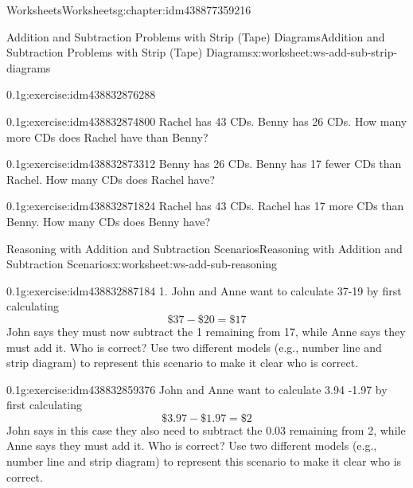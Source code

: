 \documentclass[twoside,11pt,]{book}
\begin{document}
\begin{chapterptx}{Worksheets}{}{Worksheets}{}{}{g:chapter:idm438877359216}
\begin{worksheet-section-numberless}{Addition and Subtraction Problems with Strip (Tape) Diagrams}{}{Addition and Subtraction Problems with Strip (Tape) Diagrams}{}{}{x:worksheet:ws-add-sub-strip-diagrams}
\begin{divisionexercise}{4}{}{0.1}{g:exercise:idm438832876288}
\end{divisionexercise}%
\begin{divisionexercise}{5}{}{0.1}{g:exercise:idm438832874800}%
Rachel has 43 CDs.  Benny has 26 CDs.  How many more CDs does Rachel have than Benny?%
\end{divisionexercise}%
\begin{divisionexercise}{6}{}{0.1}{g:exercise:idm438832873312}%
Benny has 26 CDs. Benny has 17 fewer CDs than Rachel.  How many CDs does Rachel have?%
\end{divisionexercise}%
\begin{divisionexercise}{7}{}{0.1}{g:exercise:idm438832871824}%
Rachel has 43 CDs. Rachel has 17 more CDs than Benny.  How many CDs does Benny have?%
\end{divisionexercise}%
\end{worksheet-section-numberless}
\restoregeometry
%
%
\typeout{************************************************}
\typeout{************************************************}
%
\begin{worksheet-section-numberless}{Reasoning with Addition and Subtraction Scenarios}{}{Reasoning with Addition and Subtraction Scenarios}{}{}{x:worksheet:ws-add-sub-reasoning}
\begin{divisionexercise}{1}{}{0.1}{g:exercise:idm438832887184}%
1.	John and Anne want to calculate \textdollar{}37-\textdollar{}19 by first calculating%
\begin{equation*}
\$37-\$20=\$17 
\end{equation*}
John says they must now subtract the \textdollar{}1 remaining from \textdollar{}17, while Anne says they must add it.  Who is correct?  Use two different models (e.g., number line and strip diagram) to represent this scenario to make it clear who is correct.%
\end{divisionexercise}%
\begin{divisionexercise}{2}{}{0.1}{g:exercise:idm438832859376}%
John and Anne want to calculate \textdollar{}3.94 -\textdollar{}1.97 by first calculating%
\begin{equation*}
\$3.97-\$1.97 = \$2 
\end{equation*}
John says in this case they also need to subtract the \textdollar{}0.03 remaining from \textdollar{}2, while Anne says they must add it.  Who is correct?  Use two different models (e.g., number line and strip diagram) to represent this scenario to make it clear who is correct.%

\end{divisionexercise}
\end{worksheet-section-numberless}
\end{chapterptx}
\end{document}

